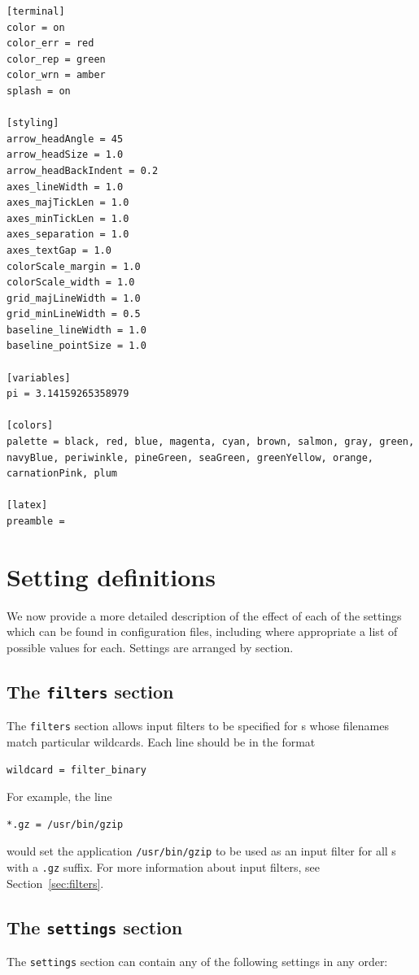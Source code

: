 \begin{verbatim}
[terminal]
color = on
color_err = red
color_rep = green
color_wrn = amber
splash = on

[styling]
arrow_headAngle = 45
arrow_headSize = 1.0
arrow_headBackIndent = 0.2
axes_lineWidth = 1.0
axes_majTickLen = 1.0
axes_minTickLen = 1.0
axes_separation = 1.0
axes_textGap = 1.0
colorScale_margin = 1.0
colorScale_width = 1.0
grid_majLineWidth = 1.0
grid_minLineWidth = 0.5
baseline_lineWidth = 1.0
baseline_pointSize = 1.0

[variables]
pi = 3.14159265358979

[colors]
palette = black, red, blue, magenta, cyan, brown, salmon, gray, green, navyBlue, periwinkle, pineGreen, seaGreen, greenYellow, orange, carnationPink, plum

[latex]
preamble =
\end{verbatim}

\section{Setting definitions}

We now provide a more detailed description of the effect of each of the
settings which can be found in configuration files, including where appropriate
a list of possible values for each. Settings are arranged by section.

\subsection{The {\tt filters} section}

The {\tt filters} section allows input filters to be specified for \datafile s
whose filenames match particular wildcards. Each line should be in the format
\begin{verbatim}
wildcard = filter_binary
\end{verbatim}
For example, the line
\begin{verbatim}
*.gz = /usr/bin/gzip
\end{verbatim}
would set the application {\tt /usr/bin/gzip} to be used as an input filter for
all \datafile s with a {\tt .gz} suffix. For more information about input
filters, see Section~\ref{sec:filters}.

\subsection{The {\tt settings} section}
\label{sec:configfile_settings}

The {\tt settings} section can contain any of the following settings in any order:

